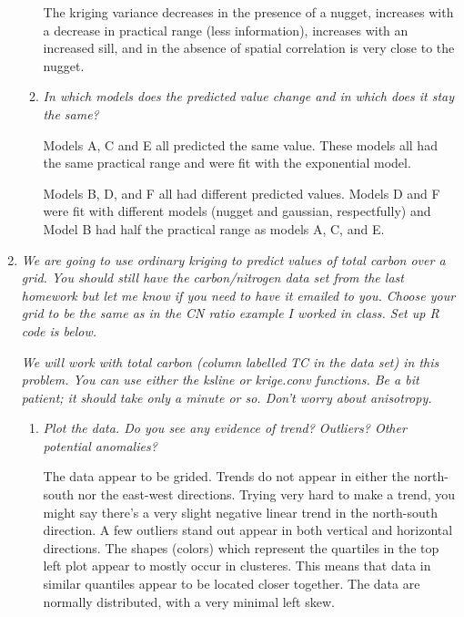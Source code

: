 \documentclass{article}\usepackage[]{graphicx}\usepackage[]{color}
\newenvironment{knitrout}{}{} %
\begin{document}
\begin{enumerate}
\begin{enumerate}
The kriging variance decreases in the presence of a nugget, increases with a decrease in practical range (less information), increases with an increased sill, and in the absence of spatial correlation is very close to the nugget.

\item
{\it In which models does the predicted value change and in which does it stay the same?}

Models A, C and E all predicted the same value. These models all had the same practical range and were fit with the exponential model.

Models B, D, and F all had different predicted values. Models D and F were fit with different models (nugget and gaussian, respectfully) and Model B had half the practical range as models A, C, and E.

\end{enumerate}

\item
{\it We are going to use ordinary kriging to predict values of total carbon over a grid. You should still have the carbon/nitrogen data set from the last homework but let me know if you need to have it emailed to you. Choose your grid to be the same as in the CN ratio example I worked in class. Set up R code is below.}



{\it We will work with total carbon (column labelled TC in the data set) in this problem. You can use either the ksline or krige.conv functions. Be a bit patient; it should take only a minute or so. Don’t worry about anisotropy.}
\begin{enumerate}
\item {\it Plot the data. Do you see any evidence of trend? Outliers? Other potential anomalies?}

The data appear to be grided. Trends do not appear in either the north-south nor the east-west directions. Trying very hard to make a trend, you might say there's a very slight negative linear trend in the north-south direction. A few outliers stand out appear in both vertical and horizontal directions. The shapes (colors) which represent the quartiles in the top left plot appear to mostly occur in clusteres. This means that data in similar quantiles appear to be located closer together. The data are normally distributed, with a very minimal left skew.

\begin{knitrout}\footnotesize
{}\color{fgcolor}


\end{knitrout}
\end{enumerate}
\end{enumerate}
\end{document}
